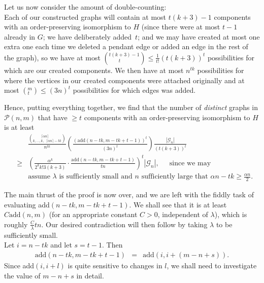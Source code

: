 \documentclass{article}
\newtheorem{Proof of Theorem}{Proof of Theorem}
\begin{document}
Let us now consider the amount of double-counting: \\
Each of our constructed graphs will contain at most $t(k+3)-1$ components with an order-preserving isomorphism to $H$
(since there were at most $t-1$ already in $G$; 
we have deliberately added~$t$;
and we may have created at most one extra one each time 
we deleted a pendant edge or added an edge in the rest of the graph),
so we have at most 
$\left(^{t(k+3)-1}_{\phantom{wwp}t}\right) \leq \frac{1}{t!} (t(k+3))^{t}$ 
possibilities for which are our created components.
We then have at most $n^{tk}$ 
possibilities for where the vertices in our created components were attached originally 
and at most $\left(^{m}_{t}\right) \leq (3n)^{t}$ possibilities for which edges was added.

Hence, putting everything together,
we find that the number of \textit{distinct} graphs in $\mathcal{P}(n,m)$ that have $\geq t$ components 
with an order-preserving isomorphism to $H$ is at least 
\begin{eqnarray*}
& & \frac{ \left( ^{\phantom{wwqq} \lceil \alpha n \rceil}_{k, \ldots, k, \phantom{p} \lceil \alpha n \rceil -tk} \right)}
{n^{tk}}
\left( \frac{ (\textrm{add}(n-tk,m-tk+t-1))^{t}}{(3n)^{t}} \right)
\frac{|\mathcal{G}_{n}|}{(t(k+3))^{t}} \\
& \geq & 
\left( \frac{\alpha^{k}}{2^{k}k!3(k+3)} \cdot \frac{\textrm{add}(n-tk,m-tk+t-1)}{tn} \right)^{t} |\mathcal{G}_{n}|, 
\phantom{ww} \textrm{since we may} \\
& & \textrm{assume $\lambda$ is sufficiently small and $n$ sufficiently large 
that $\alpha n - tk \geq \frac{\alpha n}{2}$}.
\end{eqnarray*} 
\phantom{p}

The main thrust of the proof is now over,
and we are left with the fiddly task of evaluating
add$(n-tk,m-tk+t-1)$.
We shall see that it is at least $C\textrm{add}(n,m)$
(for an appropriate constant $C>0$,
independent of $\lambda$),
which is roughly $\frac{C}{\lambda}tn$.
Our desired contradiction will then follow by taking $\lambda$ to be sufficiently small. \\

Let $i=n-tk$ and let $s=t-1$.
Then
\begin{eqnarray}
\textrm{add}(n-tk,m-tk+t-1) 
& = & \textrm{add}(i,i+(m-n+s)). \label{eq:a1} 
\end{eqnarray}
Since add$(i,i+l)$ is quite sensitive to changes in $l$,
we shall need to investigate the value of $m-n+s$ in detail. 
\end{document}
